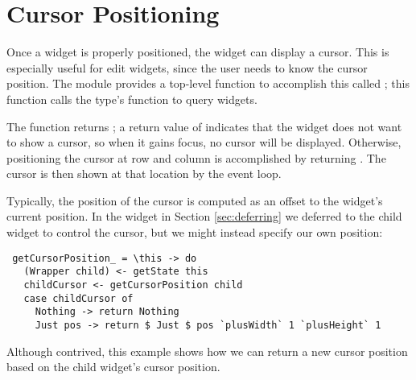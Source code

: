 \section{Cursor Positioning}

Once a widget is properly positioned, the widget can display a cursor.
This is especially useful for edit widgets, since the user needs to
know the cursor position.  The  module provides a top-level
function to accomplish this called ; this
function calls the  type's 
function to query widgets.

The  function returns ; a return value of  indicates that the
widget does not want to show a cursor, so when it gains focus, no
cursor will be displayed.  Otherwise, positioning the cursor at row
 and column  is accomplished by returning .  The cursor is then shown at that location by
the event loop.

Typically, the position of the cursor is computed as an offset to the
widget's current position.  In the  widget in Section
\ref{sec:deferring} we deferred to the child widget to control the
cursor, but we might instead specify our own position:

\begin{verbatim}
 getCursorPosition_ = \this -> do
   (Wrapper child) <- getState this
   childCursor <- getCursorPosition child
   case childCursor of
     Nothing -> return Nothing
     Just pos -> return $ Just $ pos `plusWidth` 1 `plusHeight` 1
\end{verbatim}

Although contrived, this example shows how we can return a new cursor
position based on the child widget's cursor position.
